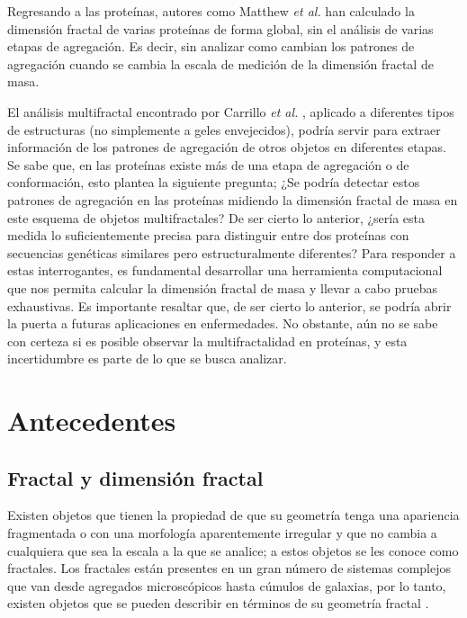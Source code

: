 \documentclass[11pt]{article}
\begin{document}
Regresando a las prote\'{i}nas, autores como Matthew \textit{et al.} \cite{Enright2005} han calculado la dimensi\'{o}n fractal de varias prote\'{i}nas de forma global, sin el an\'{a}lisis de varias etapas de agregaci\'{o}n. Es decir, sin analizar como cambian los patrones de agregaci\'{o}n cuando se cambia la escala de medici\'{o}n de la dimensi\'{o}n fractal de masa.

El an\'{a}lisis multifractal encontrado por Carrillo \textit{et al.} \cite{Carrillo2003}, aplicado a diferentes tipos de estructuras (no simplemente a geles envejecidos), podr\'{i}a servir para extraer informaci\'{o}n de los patrones de agregaci\'{o}n de otros objetos en diferentes etapas. Se sabe que, en las prote\'{i}nas existe m\'{a}s de una etapa de agregaci\'{o}n o de conformaci\'{o}n, esto plantea la siguiente pregunta; ¿Se podr\'{i}a detectar estos patrones de agregaci\'{o}n en las prote\'{i}nas midiendo la dimensi\'{o}n fractal de masa en este esquema de objetos multifractales? De ser cierto lo anterior, ¿ser\'{i}a esta medida lo suficientemente precisa para distinguir entre dos prote\'{i}nas con secuencias gen\'{e}ticas similares pero estructuralmente diferentes? Para responder a estas interrogantes, es fundamental desarrollar una herramienta computacional que nos permita calcular la dimensi\'{o}n fractal de masa y llevar a cabo pruebas exhaustivas. Es importante resaltar que, de ser cierto lo anterior, se podr\'{i}a abrir la puerta a futuras aplicaciones en enfermedades. No obstante, a\'{u}n no se sabe con certeza si es posible observar la multifractalidad en prote\'{i}nas, y esta incertidumbre es parte de lo que se busca analizar.


\section{Antecedentes}

\subsection{Fractal y dimensi\'{o}n fractal}
\label{subsec:subseccion2.1}


Existen objetos que tienen la propiedad de que su geometr\'{i}a tenga una apariencia fragmentada o con una morfolog\'{i}a aparentemente irregular y que no cambia a cualquiera que sea la escala a la que se analice; a estos objetos se les conoce como fractales. Los fractales est\'{a}n presentes en un gran n\'{u}mero de sistemas complejos que van desde agregados microsc\'{o}picos hasta c\'{u}mulos de galaxias, por lo tanto, existen objetos que se pueden describir en t\'{e}rminos de su geometr\'{i}a fractal \cite{Vicsek1992}. 
\end{document}
